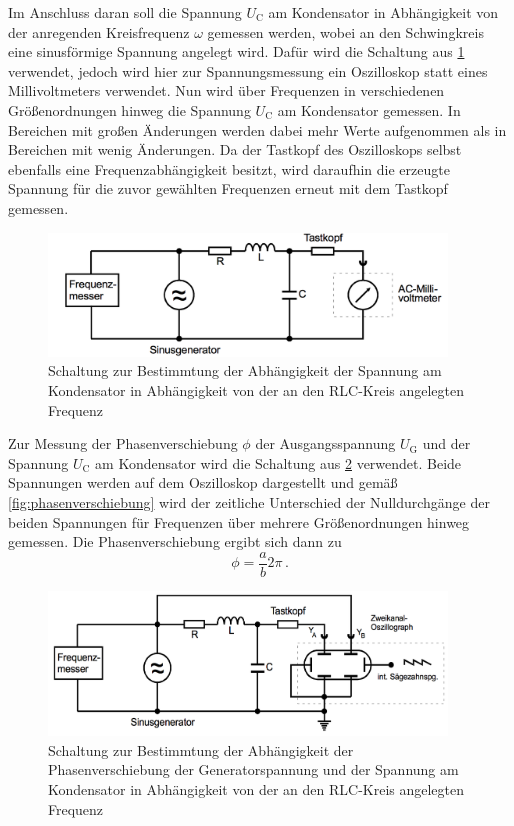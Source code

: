 Im Anschluss daran soll die Spannung $U_{\text{C}}$ am Kondensator in Abhängigkeit
von der anregenden Kreisfrequenz $\omega$ gemessen werden, wobei an den Schwingkreis eine
sinusförmige Spannung angelegt wird. Dafür wird die Schaltung aus \ref{fig:aufbau_3} verwendet,
jedoch wird hier zur Spannungsmessung ein Oszilloskop statt eines Millivoltmeters
verwendet. Nun wird über Frequenzen in verschiedenen Größenordnungen hinweg die
Spannung $U_{\text{C}}$  am Kondensator gemessen. In Bereichen mit großen Änderungen
 werden dabei mehr Werte aufgenommen als in Bereichen mit wenig Änderungen.
Da der Tastkopf des Oszilloskops selbst ebenfalls eine Frequenzabhängigkeit besitzt,
wird daraufhin die erzeugte Spannung für die zuvor gewählten Frequenzen erneut mit
dem Tastkopf gemessen.
\begin{figure}
  \centering
  \includegraphics[width=300pt]{data/aufbau_3.png}
  \caption{Schaltung zur Bestimmtung der Abhängigkeit der Spannung am Kondensator
  in Abhängigkeit von der an den RLC-Kreis angelegten Frequenz\cite{Versuchsanleitung1}}
  \label{fig:aufbau_3}
\end{figure}


Zur Messung der Phasenverschiebung $\phi$ der Ausgangsspannung $U_{\text{G}}$ und
der Spannung $U_{\text{C}}$ am Kondensator wird die Schaltung aus \ref{fig:aufbau_4} verwendet.
Beide Spannungen werden auf dem Oszilloskop dargestellt und gemäß \ref{fig:phasenverschiebung} wird der
zeitliche Unterschied der Nulldurchgänge der beiden Spannungen für Frequenzen
über mehrere Größenordnungen hinweg gemessen. Die Phasenverschiebung ergibt sich
dann zu
\begin{equation}
  \phi=\frac{a}{b}2\pi\,.
  \label{eqn:ab2phi}
\end{equation}

\begin{figure}
  \centering
  \includegraphics[width=300pt]{data/aufbau_4.png}
  \caption{Schaltung zur Bestimmtung der Abhängigkeit der Phasenverschiebung der
  Generatorspannung und der Spannung am Kondensator in Abhängigkeit von der
  an den RLC-Kreis angelegten Frequenz \cite{Versuchsanleitung1}}
  \label{fig:aufbau_4}
\end{figure}

